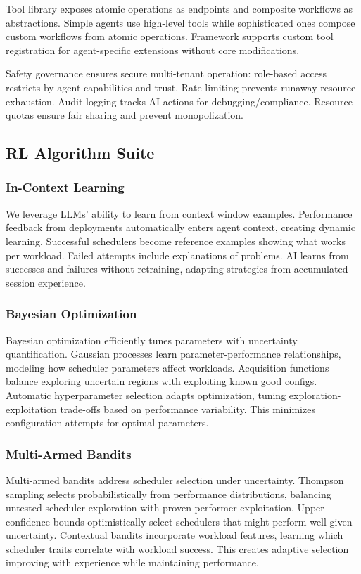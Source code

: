Tool library exposes atomic operations as endpoints and composite workflows as abstractions. Simple agents use high-level tools while sophisticated ones compose custom workflows from atomic operations. Framework supports custom tool registration for agent-specific extensions without core modifications.

Safety governance ensures secure multi-tenant operation: role-based access restricts by agent capabilities and trust. Rate limiting prevents runaway resource exhaustion. Audit logging tracks AI actions for debugging/compliance. Resource quotas ensure fair sharing and prevent monopolization.

\subsection{RL Algorithm Suite}

\subsubsection{In-Context Learning}
We leverage LLMs' ability to learn from context window examples. Performance feedback from deployments automatically enters agent context, creating dynamic learning. Successful schedulers become reference examples showing what works per workload. Failed attempts include explanations of problems. AI learns from successes and failures without retraining, adapting strategies from accumulated session experience.

\subsubsection{Bayesian Optimization}
Bayesian optimization efficiently tunes parameters with uncertainty quantification. Gaussian processes learn parameter-performance relationships, modeling how scheduler parameters affect workloads. Acquisition functions balance exploring uncertain regions with exploiting known good configs. Automatic hyperparameter selection adapts optimization, tuning exploration-exploitation trade-offs based on performance variability. This minimizes configuration attempts for optimal parameters.

\subsubsection{Multi-Armed Bandits}
Multi-armed bandits address scheduler selection under uncertainty. Thompson sampling selects probabilistically from performance distributions, balancing untested scheduler exploration with proven performer exploitation. Upper confidence bounds optimistically select schedulers that might perform well given uncertainty. Contextual bandits incorporate workload features, learning which scheduler traits correlate with workload success. This creates adaptive selection improving with experience while maintaining performance.


